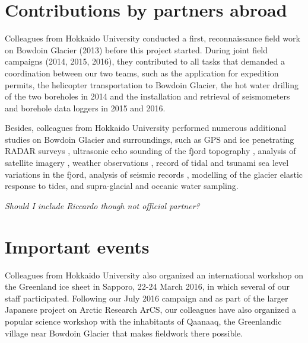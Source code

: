 \documentclass{article}
\begin{document}
\section{Contributions by partners abroad}

Colleagues from Hokkaido University conducted a first, reconnaissance field
work on Bowdoin Glacier (2013) before this project started. During joint field
campaigns (2014, 2015, 2016), they contributed to all tasks that demanded a
coordination between our two teams, such as the application for expedition
permits, the helicopter transportation to Bowdoin Glacier, the hot water
drilling of the two boreholes in 2014 and the installation and retrieval of
seismometers and borehole data loggers in 2015 and 2016.

Besides, colleagues from Hokkaido University performed numerous additional
studies on Bowdoin Glacier and surroundings, such as GPS and ice penetrating
RADAR surveys \citep{Sugiyama.etal.2015, Tsutaki.etal.2016}, ultrasonic echo
sounding of the fjord topography \citep{Sugiyama.etal.2015}, analysis of
satellite imagery \citep{Sugiyama.etal.2015, Tsutaki.etal.2016}, weather
observations \citep{Sugiyama.etal.2015}, record of tidal and tsunami sea level
variations in the fjord, analysis of seismic records
\citep{Podolskiy.etal.2016}, modelling of the glacier elastic response to
tides, and supra-glacial and oceanic water sampling.

\emph{Should I include Riccardo though not official partner?}


\section{Important events}

Colleagues from Hokkaido University also organized an international workshop
on the Greenland ice sheet in Sapporo, 22-24 March 2016, in which several of
our staff participated. Following our July 2016 campaign and as part of the
larger Japanese project on Arctic Research ArCS, our colleagues have also
organized a popular science workshop with the inhabitants of Qaanaaq, the
Greenlandic village near Bowdoin Glacier that makes fieldwork there possible.






\end{document}
